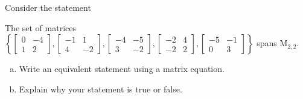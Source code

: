 
\begin{exerciseStatement}


Consider the statement 
\begin{center}\begin{minipage}{0.8\textwidth}
 The set of matrices \( \left\{ \left[\begin{array}{cc}
0 & -4 \\
1 & 2
\end{array}\right] , \left[\begin{array}{cc}
-1 & 1 \\
4 & -2
\end{array}\right] , \left[\begin{array}{cc}
-4 & -5 \\
3 & -2
\end{array}\right] , \left[\begin{array}{cc}
-2 & 4 \\
-2 & 2
\end{array}\right] , \left[\begin{array}{cc}
-5 & -1 \\
0 & 3
\end{array}\right] \right\} \) spans \(\mathrm{M}_{2,2}\). 
\end{minipage}\end{center}
    


\begin{enumerate}[(a)]
\item  Write an equivalent statement using a matrix equation.
\item  Explain why your statement is true or false.
\end{enumerate}
    
\end{exerciseStatement}
    
